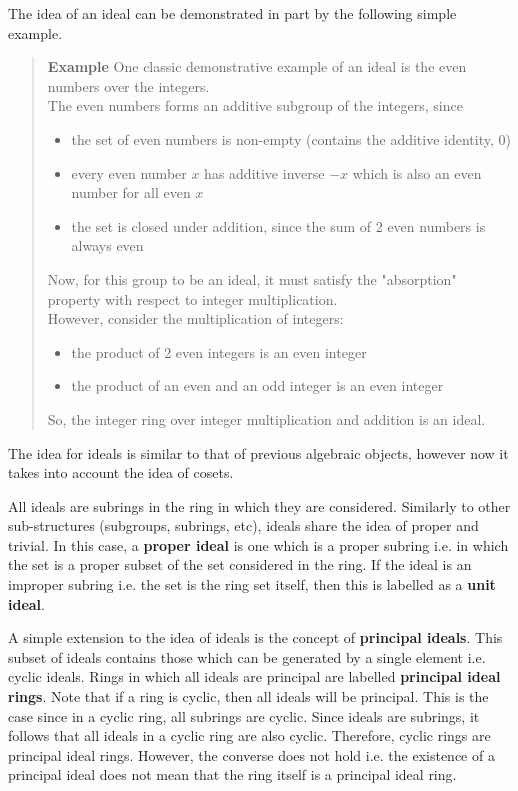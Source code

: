 \documentclass[letterpaper,12pt,titlepage,oneside,final]{book}
\newcounter{examplecounter}
\newenvironment{example}{\begin{quote}%
    \refstepcounter{examplecounter}%
  \textbf{Example \arabic{examplecounter}}%
  \quad
}{%
\end{quote}%
}
\begin{document}
The idea of an ideal can be demonstrated in part by the following simple example.  

\begin{example}\label{ex: Simple ideal}
  One classic demonstrative example of an ideal is the even numbers over the integers.\\ 
  The even numbers forms an additive subgroup of the integers, since 
  \begin{itemize}
    \item the set of even numbers is non-empty (contains the additive identity, 0)
    \item every even number ${x}$ has additive inverse ${-x}$ which is also an even number for all even ${x}$
    \item the set is closed under addition, since the sum of 2 even numbers is always even
  \end{itemize}
  Now, for this group to be an ideal, it must satisfy the "absorption" property with respect to integer multiplication.\\
  However, consider the multiplication of integers:
  \begin{itemize}
    \item the product of 2 even integers is an even integer
    \item the product of an even and an odd integer is an even integer
  \end{itemize}
  So, the integer ring over integer multiplication and addition is an ideal.
\end{example}

The idea for ideals is similar to that of previous algebraic objects, however now it takes into account the idea of cosets.

All ideals are subrings in the ring in which they are considered.  Similarly to other sub-structures (subgroups, subrings, etc), ideals share the idea of proper and trivial.  In this case, a \textbf{proper ideal} is one which is a proper subring i.e. in which the set is a proper subset of the set considered in the ring.  If the ideal is an improper subring i.e. the set is the ring set itself, then this is labelled as a \textbf{unit ideal}.  

A simple extension to the idea of ideals is the concept of \textbf{principal ideals}.  This subset of ideals contains those which can be generated by a single element i.e. cyclic ideals.  Rings in which all ideals are principal are labelled \textbf{principal ideal rings}.  Note that if a ring is cyclic, then all ideals will be principal.  This is the case since in a cyclic ring, all subrings are cyclic.  Since ideals are subrings, it follows that all ideals in a cyclic ring are also cyclic.  Therefore, cyclic rings are principal ideal rings.  However, the converse does not hold i.e. the existence of a principal ideal does not mean that the ring itself is a principal ideal ring.  
\end{document}
